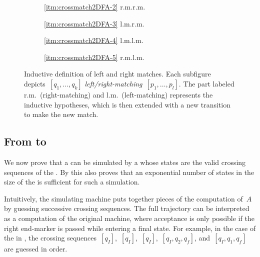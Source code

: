 \begin{figure}
	\centering
	\begin{subfigure}{0.246\textwidth}
		\centering
		
		\caption*{\ref{itm:crossmatch2DFA-2} r.m.\tto r.m.}
	\end{subfigure}
	\hfill
	\begin{subfigure}{0.242\textwidth}
		\centering
		
		\caption*{\ref{itm:crossmatch2DFA-3} l.m.\tto r.m.}
	\end{subfigure}
	\hfill
	\begin{subfigure}{0.242\textwidth}
		\centering
		
		\caption*{\ref{itm:crossmatch2DFA-4} l.m.\tto l.m.}
	\end{subfigure}
	\hfill
	\begin{subfigure}{0.246\textwidth}
		\centering
		
		\caption*{\ref{itm:crossmatch2DFA-5} r.m.\tto l.m.}
	\end{subfigure}
	\caption[The rules in the definition of matching crossing sequences.]{Inductive definition of left and right matches. Each subfigure depicts~$[q_1,\dots,q_k]$ \emph{left/right-matching}~$[p_1,\dots,p_l]$. The part labeled r.m.\ (right-matching) and l.m.\ (left-matching) represents the inductive hypotheses, which is then extended with a new transition to make the new match.}
	\label{fig:2DFA-crossmatch}
\end{figure}


\subsection{From \texorpdfstring{\TDFAs}{2DFAs} to \texorpdfstring{\ONFAs}{1NFAs}}
We now prove that a \TDFA can be simulated by a \ONFA whose states are the valid crossing sequences of the \TDFA.
By  this also proves that an exponential number of states in the size of the \TDFA is sufficient for such a simulation.

Intuitively, the simulating machine puts together pieces of the computation of~$A$%
by guessing successive crossing sequences.
The full trajectory can be interpreted as a computation of the original machine, where acceptance is only possible if the right end-marker is passed while entering a final state.
For example, in the case of the \TDFA in , the crossing sequences~$[q_I]$,~$[q_I]$,~$[q_I]$,~$[q_I,q_2,q_f]$, and~$[q_I,q_1,q_f]$ are guessed in order.

